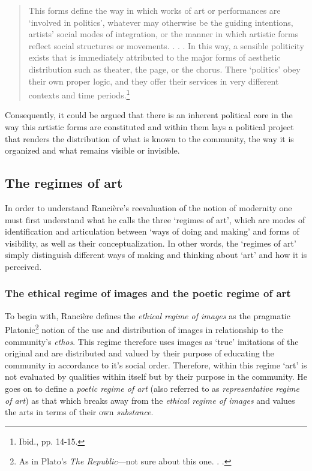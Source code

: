\begin{quote}
This forms define the way in which works of art or performances are `involved in politics', whatever may otherwise be the guiding intentions, artists' social modes of integration, or the manner in which artistic forms reflect social structures or movements. . . . In this way, a sensible politicity exists that is immediately attributed to the major forms of aesthetic distribution such as theater, the page, or the chorus. There `politics' obey their own proper logic, and they offer their services in very different contexts and time periods.\footnote{Ibid., pp. 14-15.} 
\end{quote}
Consequently, it could be argued that there is an inherent political core in the way this artistic forms are constituted and within them lays a political project that renders the distribution of what is known to the community, the way it is organized and what remains visible or invisible.    

\subsection{The regimes of art}

In order to understand Ranci\`{e}re's reevaluation of the notion of modernity one must first understand what he calls the three `regimes of art', which are modes of identification and articulation between `ways of doing and making' and forms of visibility, as well as their conceptualization. In other words, the `regimes of art' simply distinguish different ways of making and thinking about `art' and how it is perceived.

\subsubsection{The ethical regime of images and the poetic regime of art}

To begin with, Ranci\`{e}re defines the \emph{ethical regime of images} as the pragmatic Platonic\footnote{As in Plato's \emph{The Republic}---not sure about this one. . .} notion of the use and distribution of images in relationship to the community's \emph{ethos}. This regime therefore uses images as `true' imitations of the original and are distributed and valued by their purpose of educating the community in accordance to it's social order. Therefore, within this regime `art' is not evaluated by qualities within itself but by their purpose in the community. He goes on to define a \emph{poetic regime of art} (also referred to as \emph{representative regime of art}) as that which breaks away from the \emph{ethical regime of images} and values the arts in terms of their own \emph{substance}.


